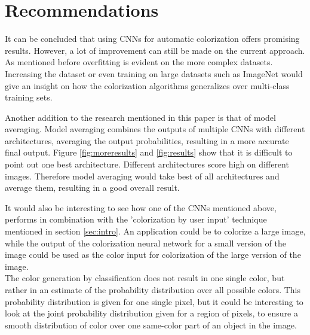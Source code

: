 \section{Recommendations}



It can be concluded that using CNNs for automatic colorization offers promising results. However, a lot of improvement can still be made on the current approach. As mentioned before overfitting is evident on the more complex datasets. Increasing the dataset or even training on large datasets such as ImageNet \cite{deng2009imagenet} would give an insight on how the colorization algorithms generalizes over multi-class training sets. 

Another addition to the research mentioned in this paper is that of model averaging. Model averaging combines the outputs of multiple CNNs with different architectures, averaging the output probabilities, resulting in a more accurate final output. Figure \ref{fig:moreresults} and \ref{fig:results} show that it is difficult to point out one best architecture. Different architectures score high on different images. Therefore model averaging would take best of all architectures and average them, resulting in a good overall result.


It would also be interesting to see how one of the CNNs mentioned above, performs in combination with the 'colorization by user input' technique mentioned in section \ref{sec:intro}. An application could be to colorize a large image, while the output of the colorization neural network for a small version of the image could be used as the color input for colorization of the large version of the image.\\

The color generation by classification does not result in one single color, but rather in an estimate of the probability distribution over all possible colors. This probability distribution is given for one single pixel, but it could be interesting to look at the joint probability distribution given for a region of pixels, to ensure a smooth distribution of color over one same-color part of an object in the image.

